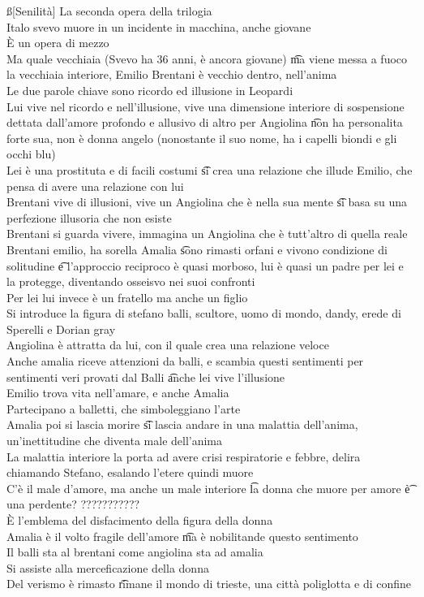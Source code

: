\documentclass[12pt]{article}
\begin{document}
\ss[Senilità]
La seconda opera della trilogia \\
Italo svevo muore in un incidente in macchina, anche giovane \\
È un opera di mezzo \\
Ma quale vecchiaia (Svevo ha 36 anni, è ancora giovane) \t ma viene messa a fuoco la vecchiaia interiore, Emilio Brentani è vecchio dentro, nell'anima \\
Le due parole chiave sono ricordo ed illusione in Leopardi \\
Lui vive nel ricordo e nell'illusione, vive una dimensione interiore di sospensione dettata dall'amore profondo e allusivo di altro per Angiolina \t non ha personalita forte sua, non è donna angelo (nonostante il suo nome, ha i capelli biondi e gli occhi blu) \\
Lei è una prostituta e di facili costumi \t si crea una relazione che illude Emilio, che pensa di avere una relazione con lui \\
Brentani vive di illusioni, vive un Angiolina che è nella sua mente \t si basa su una perfezione illusoria che non esiste \\
Brentani si guarda vivere, immagina un Angiolina che è tutt'altro di quella reale \\
Brentani emilio, ha sorella Amalia \t sono rimasti orfani e vivono condizione di solitudine \t e l'approccio reciproco è quasi morboso, lui è quasi un padre per lei e la protegge, diventando osseisvo nei suoi confronti \\
Per lei lui invece è un fratello ma anche un figlio \\
Si introduce la figura di stefano balli, scultore, uomo di mondo, dandy, erede di Sperelli e Dorian gray \\
Angiolina è attratta da lui, con il quale crea una relazione veloce \\
Anche amalia riceve attenzioni da balli, e scambia questi sentimenti per sentimenti veri provati dal Balli \t anche lei vive l'illusione \\
Emilio trova vita nell'amare, e anche Amalia \\
Partecipano a balletti, che simboleggiano l'arte \\
Amalia poi si lascia morire \t si lascia andare in una malattia dell'anima, un'inettitudine che diventa male dell'anima \\
La malattia interiore la porta ad avere crisi respiratorie e febbre, delira chiamando Stefano, esalando l'etere quindi muore \\
C'è il male d'amore, ma anche un male interiore \t la donna che muore per amore \t è una perdente? ??????????? \\
È l'emblema del disfacimento della figura della donna \\
Amalia è il volto fragile dell'amore \t ma è nobilitande questo sentimento \\
Il balli sta al brentani come angiolina sta ad amalia \\
Si assiste alla merceficazione della donna \\
Del verismo è rimasto \t rimane il mondo di trieste, una città poliglotta e di confine
\end{document}
